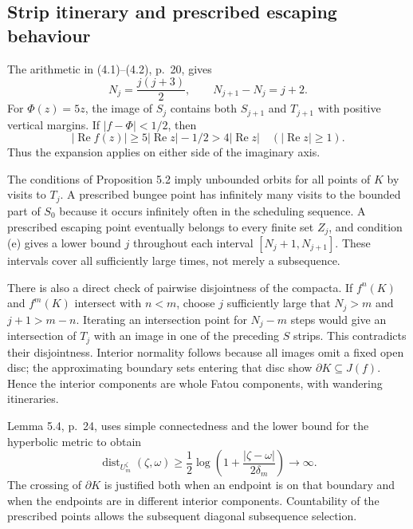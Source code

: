 \documentclass[10pt]{article}
\begin{document}
\subsection*{Strip itinerary and prescribed escaping behaviour}
The arithmetic in (4.1)–(4.2), p. 20, gives \[N_j=\frac{j(j+3)}2,\qquad N_{j+1}-N_j=j+2.\] For \(\Phi(z)=5z\), the image of \(S_j\) contains both \(S_{j+1}\) and \(T_{j+1}\) with positive vertical margins. If \(|f-\Phi|<1/2\), then \[|\operatorname{Re}f(z)|\geq5|\operatorname{Re}z|-1/2
   >4|\operatorname{Re}z|\quad (|\operatorname{Re}z|\geq1).\] Thus the expansion applies on either side of the imaginary axis.\par
The conditions of Proposition 5.2 imply unbounded orbits for all points of \(K\) by visits to \(T_j\). A prescribed bungee point has infinitely many visits to the bounded part of \(S_0\) because it occurs infinitely often in the scheduling sequence. A prescribed escaping point eventually belongs to every finite set \(Z_j\), and condition (e) gives a lower bound \(j\) throughout each interval \([N_j+1,N_{j+1}]\). These intervals cover all sufficiently large times, not merely a subsequence.\par
There is also a direct check of pairwise disjointness of the compacta. If \(f^n(K)\) and \(f^m(K)\) intersect with \(n<m\), choose \(j\) sufficiently large that \(N_j>m\) and \(j+1>m-n\). Iterating an intersection point for \(N_j-m\) steps would give an intersection of \(T_j\) with an image in one of the preceding \(S\) strips. This contradicts their disjointness. Interior normality follows because all images omit a fixed open disc; the approximating boundary sets entering that disc show \(\partial K\subseteq J(f)\). Hence the interior components are whole Fatou components, with wandering itineraries.\par
Lemma 5.4, p. 24, uses simple connectedness and the lower bound for the hyperbolic metric to obtain \[\operatorname{dist}_{U_m^\zeta}(\zeta,\omega)
 \geq\frac12\log\left(1+\frac{|\zeta-\omega|}{2\delta_m}\right)
 \longrightarrow\infty.\] The crossing of \(\partial K\) is justified both when an endpoint is on that boundary and when the endpoints are in different interior components. Countability of the prescribed points allows the subsequent diagonal subsequence selection.\par
\end{document}
